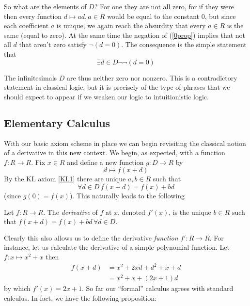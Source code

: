 So what are the elements of \( D \)? For one they are not all zero, for if they were then every function \( d\mapsto ad, a\in R \) would be equal to the constant \( 0 \), but since each coefficient \( a \) is unique, we again reach the absurdity that every \( a\in R \) is the same (equal to zero). At the same time the negation of (\ref{0prop}) implies that not all \( d \) that aren't zero satisfy \( \neg(d=0) \). The consequence is the simple statement that
\begin{equation*}
  \exists d\in D \neg\neg(d=0)
\end{equation*}

The infinitesimals \( D \) are thus neither zero nor nonzero. This is a contradictory statement in classical logic, but it is precisely of the type of phrases that we should expect to appear if we weaken our logic to intuitionistic logic.

\subsection{Elementary Calculus}

With our basic axiom scheme in place we can begin revisiting the classical notion of a derivative in this new context. We begin, as expected, with a function \( f:R\to R \). Fix \( x\in R \) and define a new function \( g:D\to R \) by
\begin{equation*}
  d\mapsto f(x+d)
\end{equation*}
By the KL axiom \ref{KL1} there are unique \( a,b\in R \) such that
\begin{equation*}
  \forall d\in D\, f(x+d) = f(x)+bd
\end{equation*}
(since \( g(0) = f(x) \)). This naturally leads to the following
\begin{defn}
  Let \( f:R\to R \). The \emph{derivative} of \( f \) at \( x \), denoted \( f'(x) \), is the unique \( b\in R \) such that \( f(x+d)=f(x)+bd\,\forall d\in D \).
  \label{def:1varder}
\end{defn}

Clearly this also allows us to define the derivative \emph{function} \( f':R\to R \). For instance, let us calculate the derivative of a simple polynomial function. Let \( f:x\mapsto x^2+x \) then
\begin{align*}
  f(x+d) & =  x^2+2xd + d^2 + x + d \\ 
         & =  x^2 + x + (2x+1)d
\end{align*}
by which \( f'(x)=2x+1 \). So far our ``formal'' calculus agrees with standard calculus. In fact, we have the following proposition:

